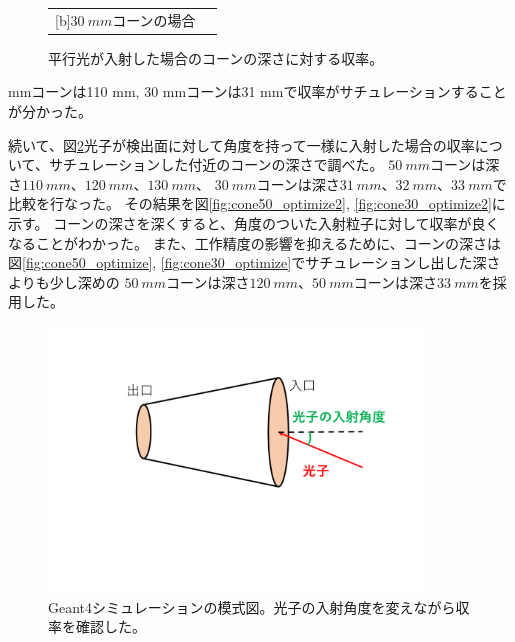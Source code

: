 \begin{figure}[htbp]
\begin{tabular}{cc}
\begin{minipage}[t]{0.45\hsize}
      [b]$\SI{30}{mm}$コーンの場合
    \end{minipage}
  \end{tabular}
  \caption{平行光が入射した場合のコーンの深さに対する収率。}
  \label{fig:cone_optimize}
\end{figure}
 mmコーンは110 mm, 30 mmコーンは31 mmで収率がサチュレーションすることが分かった。\\\indent

続いて、図\ref{fig:cone_optimize2}光子が検出面に対して角度を持って一様に入射した場合の収率について、サチュレーションした付近のコーンの深さで調べた。
$\SI{50}{mm}$コーンは深さ$\SI{110}{mm}$、$\SI{120}{mm}$、$\SI{130}{mm}$、
$\SI{30}{mm}$コーンは深さ$\SI{31}{mm}$、$\SI{32}{mm}$、$\SI{33}{mm}$で比較を行なった。
その結果を図\ref{fig:cone50_optimize2}, \ref{fig:cone30_optimize2}に示す。
コーンの深さを深くすると、角度のついた入射粒子に対して収率が良くなることがわかった。
また、工作精度の影響を抑えるために、コーンの深さは図\ref{fig:cone50_optimize}, \ref{fig:cone30_optimize}でサチュレーションし出した深さよりも少し深めの
$\SI{50}{mm}$コーンは深さ$\SI{120}{mm}$、$\SI{50}{mm}$コーンは深さ$\SI{33}{mm}$を採用した。

\begin{figure}
  \centering
  \includegraphics[width=10cm]{images/chapter3/cone_optimize2.pdf}
  \caption{Geant4シミュレーションの模式図。光子の入射角度を変えながら収率を確認した。}
  \label{fig:cone_optimize2}
\end{figure}

